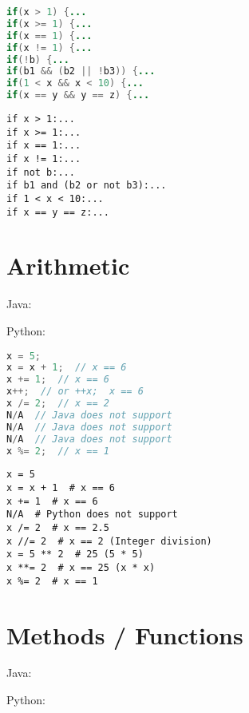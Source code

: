 \documentclass{article}
\begin{document}
\begin{minipage}{0.45\linewidth}
    \begin{lstlisting}[language=Java]
if(x > 1) {...
if(x >= 1) {...
if(x == 1) {...
if(x != 1) {...
if(!b) {...
if(b1 && (b2 || !b3)) {...
if(1 < x && x < 10) {...
if(x == y && y == z) {...
    \end{lstlisting}
\end{minipage}
\hfill
\begin{minipage}{0.45\linewidth}
    \begin{lstlisting}
if x > 1:...
if x >= 1:...
if x == 1:...
if x != 1:...
if not b:...
if b1 and (b2 or not b3):...
if 1 < x < 10:...
if x == y == z:...
    \end{lstlisting}
\end{minipage}

\section{Arithmetic}
\begin{minipage}{0.45\linewidth}
    Java:
\end{minipage}
\hfill
\begin{minipage}{0.45\linewidth}
    Python:
\end{minipage}

\begin{minipage}{0.45\linewidth}
    \begin{lstlisting}[language=Java]
x = 5;
x = x + 1;  // x == 6
x += 1;  // x == 6
x++;  // or ++x;  x == 6
x /= 2;  // x == 2
N/A  // Java does not support
N/A  // Java does not support
N/A  // Java does not support
x %= 2;  // x == 1
    \end{lstlisting}
\end{minipage}
\hfill
\begin{minipage}{0.45\linewidth}
    \begin{lstlisting}
x = 5
x = x + 1  # x == 6
x += 1  # x == 6
N/A  # Python does not support
x /= 2  # x == 2.5
x //= 2  # x == 2 (Integer division)
x = 5 ** 2  # 25 (5 * 5)
x **= 2  # x == 25 (x * x)
x %= 2  # x == 1
    \end{lstlisting}
\end{minipage}

\section{Methods / Functions}
\begin{minipage}{0.45\linewidth}
    Java:
\end{minipage}
\hfill
\begin{minipage}{0.45\linewidth}
    Python:
\end{minipage}
\end{document}
